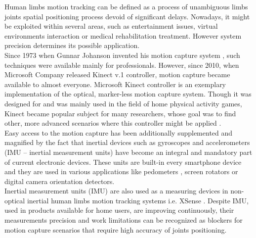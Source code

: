 \documentclass[sensors,article,submit,moreauthors,pdftex,10pt,a4paper]{mdpi}
\begin{document}
Human limbs motion tracking can be defined as a process of unambiguous limbs joints spatial positioning process devoid of significant delays. Nowadays, it might be exploited within several areas, such as entertainment issues, virtual environments interaction or medical rehabilitation treatment. However system precision determines its possible application. \\
Since 1973 when Gunnar Johanson invented his motion capture system \cite{Johansson1973}, such techniques were available mainly for professionals. However, since 2010, when Microsoft Company released Kinect v.1 controller, motion capture became available to almost everyone. Microsoft Kinect controller is an exemplary implementation of the optical, marker-less motion capture system. Though it was designed for and was mainly used in the field of home physical activity games, Kinect became popular subject for many researchers, whose goal was to find other, more advanced scenarios where this controller might be applied \cite{Lange2012, Chang2011}.\\
Easy access to the motion capture has been additionally supplemented and magnified by the fact that inertial devices such as gyroscopes and accelerometers (IMU – inertial measurement units) have become an integral and mandatory part of current electronic devices. These units are built-in every smartphone device and they are used in various applications like pedometers \cite{Huang2012,Jayalath2013}, screen rotators \cite{Pedley2013} or digital camera orientation detectors.\\
Inertial measurement units (IMU) are also used as a measuring devices in non-optical inertial human limbs motion tracking systems i.e. XSense \cite{XsensCorp}. Despite IMU, used in products available for home users, are improving continuously, their measurements precision and work limitations can be recognized as blockers for motion capture scenarios that require high accuracy of joints positioning.\\%
\end{document}
